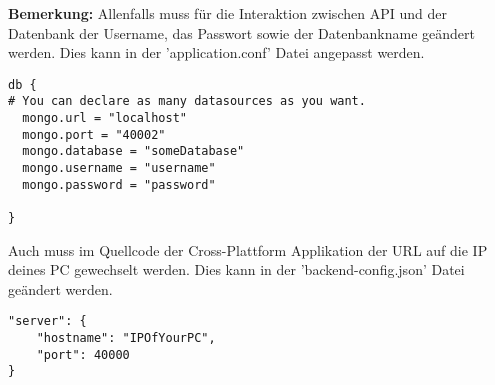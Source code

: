 \textbf{Bemerkung:} Allenfalls muss für die Interaktion zwischen API und der Datenbank der Username, das Passwort sowie der Datenbankname geändert werden. Dies kann in der 'application.conf' Datei angepasst werden.

\lstset{language=JAVA, showstringspaces=false, frame=single, captionpos=b, label=createParticipant, breaklines=true, numbers=left}
\begin{lstlisting}[caption={Verbindung zur MongoDB}, label=DBVerbindung]
db {
# You can declare as many datasources as you want.
  mongo.url = "localhost"
  mongo.port = "40002"
  mongo.database = "someDatabase"
  mongo.username = "username"
  mongo.password = "password"

}

\end{lstlisting}

Auch muss im Quellcode der Cross-Plattform Applikation der URL auf die IP deines PC gewechselt werden. Dies kann in der 'backend-config.json' Datei geändert werden.

\begin{lstlisting}[caption={Verbindung zum API}, label=APIVerbindung]
"server": {
    "hostname": "IPOfYourPC",
    "port": 40000
}
\end{lstlisting}

